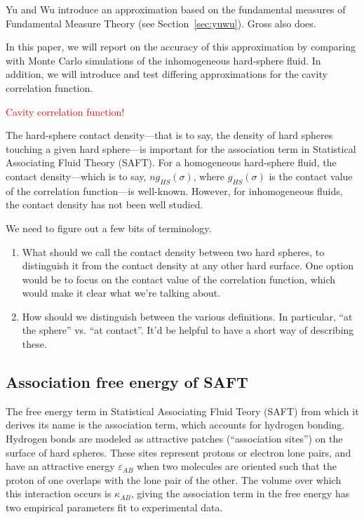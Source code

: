 \documentclass[letterpaper,twocolumn,amsmath,amssymb,prb]{revtex4-1}
\begin{document}
Yu and Wu introduce an approximation based on the fundamental measures
of Fundamental Measure Theory (see Section~\ref{sec:yuwu}).  Gross
also does\cite{gross2009density}. 

In this paper, we will report on the accuracy of this approximation by
comparing with Monte Carlo simulations of the inhomogeneous
hard-sphere fluid.  In addition, we will introduce and test differing
approximations for the cavity correlation function.

\textcolor{red}{Cavity correlation function!}

The hard-sphere contact density---that is to say, the density of hard
spheres touching a given hard sphere---is important for the
association term in Statistical Associating Fluid Theory (SAFT).
For a homogeneous hard-sphere fluid, the contact density---which is to
say, $n g_{HS}(\sigma)$, where $g_{HS}(\sigma)$ is the contact value
of the correlation function---is well-known.  However, for
inhomogeneous fluids, the contact density has not been well studied.

{
  \color{blue}We need to figure out a few bits of terminology.

  \begin{enumerate}
  \item What should we call the contact density between two hard
    spheres, to distinguish it from the contact density at any other
    hard surface.  One option would be to focus on the contact value
    of the correlation function, which would make it clear what we're
    talking about.
  \item How should we distinguish between the various definitions.  In
    particular, ``at the sphere'' vs. ``at contact''.  It'd be helpful
    to have a short way of describing these.
  \end{enumerate}
}

\subsection{Association free energy of SAFT}
\newcommand\epsilonassoc{\ensuremath{\varepsilon_\textit{AB}}}
\newcommand\kappaassoc{\ensuremath{\kappa_\textit{AB}}}
\newcommand\ncontact{\ensuremath{n_\textit{contact}}}

The free energy term in Statistical Associating Fluid Teory (SAFT)
from which it derives its name is the association term, which accounts
for hydrogen bonding.  Hydrogen bonds are modeled as attractive
patches (``association sites'') on the surface of hard spheres.  These
sites represent protons or electron lone pairs, and have an attractive
energy $\epsilonassoc$ when two molecules are oriented such that the
proton of one overlaps with the lone pair of the other.  The volume
over which this interaction occurs is $\kappaassoc$, giving the
association term in the free energy has two empirical parameters fit
to experimental data.
\end{document}
